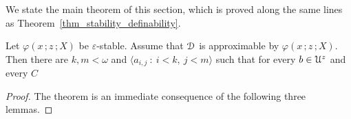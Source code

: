 


    


We state the main theorem of this section, which is proved along the same lines as Theorem~\ref{thm_stability_definability}.

\begin{theorem}\label{thm_epsilon_stability_definability}
  Let $\varphi(x\,;z\,;X)$ be $\varepsilon$-stable.
  Assume that ${\EuScript D}$ is approximable by $\varphi(x\,;z\,;X)$.
  Then there are $k,m<\omega$ and $\langle a_{i,j}\ :\ i< k,\ j<m\rangle$ such that for every $b\in{\EuScript U}^z$ and every $C$\medskip

  \medskip

\end{theorem}

\begin{proof}
  The theorem is an immediate consequence of the following three lemmas.
\end{proof}

